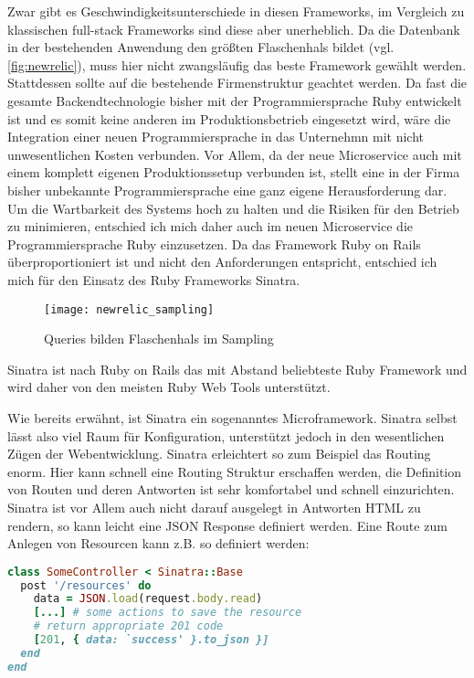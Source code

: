 Zwar gibt es Geschwindigkeitsunterschiede in diesen Frameworks\cite[vgl.][]{frameworks}, im Vergleich zu klassischen full-stack Frameworks sind diese aber unerheblich. Da die Datenbank in der bestehenden Anwendung den größten Flaschenhals bildet (vgl. \autoref{fig:newrelic}), muss hier nicht zwangsläufig das beste Framework gewählt werden. Stattdessen sollte auf die bestehende Firmenstruktur geachtet werden. Da fast die gesamte Backendtechnologie bisher mit der Programmiersprache Ruby entwickelt ist und es somit keine anderen im Produktionsbetrieb eingesetzt wird, wäre die Integration einer neuen Programmiersprache in das Unternehmn mit nicht unwesentlichen Kosten verbunden. Vor Allem, da der neue Microservice auch mit einem komplett eigenen Produktionssetup verbunden ist, stellt eine in der Firma bisher unbekannte Programmiersprache eine ganz eigene Herausforderung dar. Um die Wartbarkeit des Systems hoch zu halten und die Risiken für den Betrieb zu minimieren, entschied ich mich daher auch im neuen Microservice die Programmiersprache Ruby einzusetzen. Da das Framework Ruby on Rails überproportioniert ist und nicht den Anforderungen entspricht, entschied ich mich für den Einsatz des Ruby Frameworks Sinatra.
\begin{figure}[!ht]
    \centering
    \caption{Queries bilden Flaschenhals im Sampling}
    \label{fig:newrelic}
    \texttt{[image: newrelic\_sampling]}
\end{figure}
Sinatra ist nach Ruby on Rails das mit Abstand beliebteste Ruby Framework\cite[vgl.][]{ruby2015} und wird daher von den meisten Ruby Web Tools unterstützt.

Wie bereits erwähnt, ist Sinatra ein sogenanntes Microframework. Sinatra selbst lässt also viel Raum für Konfiguration, unterstützt jedoch in den wesentlichen Zügen der Webentwicklung. Sinatra erleichtert so zum Beispiel das Routing enorm. Hier kann schnell eine Routing Struktur erschaffen werden, die Definition von Routen und deren Antworten ist sehr komfortabel und schnell einzurichten. Sinatra ist vor Allem auch nicht darauf ausgelegt in Antworten HTML zu rendern, so kann leicht eine JSON Response definiert werden.
Eine Route zum Anlegen von Resourcen kann z.B. so definiert werden:
\begin{lstlisting}[language=Ruby]
class SomeController < Sinatra::Base
  post '/resources' do
    data = JSON.load(request.body.read)
    [...] # some actions to save the resource
    # return appropriate 201 code
    [201, { data: `success' }.to_json }]
  end
end
\end{lstlisting}

